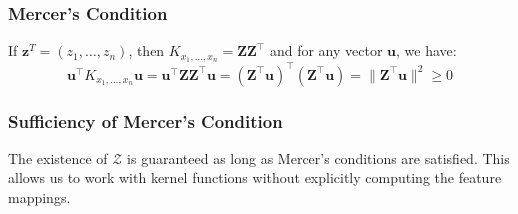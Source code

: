 \subsubsection*{Mercer's Condition}
If \( \mathbf{z}^T = (z_1, \ldots, z_n) \), then \( K_{x_1,\ldots,x_n} = \mathbf{ZZ}^\top \) and for any vector \( \mathbf{u} \), we have:
\begin{equation}
\mathbf{u}^\top K_{x_1,\ldots,x_n} \mathbf{u} = \mathbf{u}^\top \mathbf{ZZ}^\top \mathbf{u} = (\mathbf{Z}^\top \mathbf{u})^\top (\mathbf{Z}^\top \mathbf{u}) = \|\mathbf{Z}^\top \mathbf{u}\|^2 \geq 0
\end{equation}

\subsubsection*{Sufficiency of Mercer's Condition}
The existence of \( \mathcal{Z} \) is guaranteed as long as Mercer's conditions are satisfied. This allows us to work with kernel functions without explicitly computing the feature mappings.

